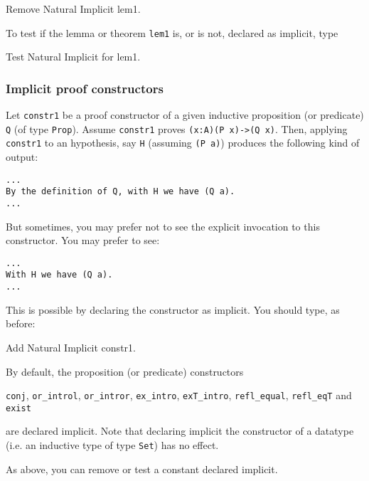 \begin{coq_example*}
Remove Natural Implicit lem1.
\end{coq_example*}

To test if the lemma or theorem \verb=lem1= is, or is not,
declared as implicit, type

\begin{coq_example*}
Test Natural Implicit for lem1.
\end{coq_example*}

\subsubsection*{Implicit proof constructors}

Let \verb=constr1= be a proof constructor of a given inductive
proposition (or predicate)
\verb=Q= (of type \verb=Prop=). Assume \verb=constr1= proves 
\verb=(x:A)(P x)->(Q x)=. Then, applying \verb=constr1= to an hypothesis,
say \verb=H= (assuming \verb=(P a)=) produces the following kind of output:

\begin{verbatim}
...
By the definition of Q, with H we have (Q a).
...
\end{verbatim}

But sometimes, you may prefer not to see the explicit invocation to
this constructor. You may prefer to see:

\begin{verbatim}
...
With H we have (Q a).
...
\end{verbatim}

This is possible by declaring the constructor as implicit. You should
type, as before:

\begin{coq_example*}
Add Natural Implicit constr1.
\end{coq_example*}

By default, the proposition (or predicate) constructors

\verb=conj=, \verb=or_introl=, \verb=or_intror=, \verb=ex_intro=,
\verb=exT_intro=, \verb=refl_equal=, \verb=refl_eqT= and \verb=exist=

\noindent are declared implicit. Note that declaring implicit the
constructor of a datatype (i.e. an inductive type of type \verb=Set=)
has no effect.

As above, you can remove or test a constant declared implicit.

